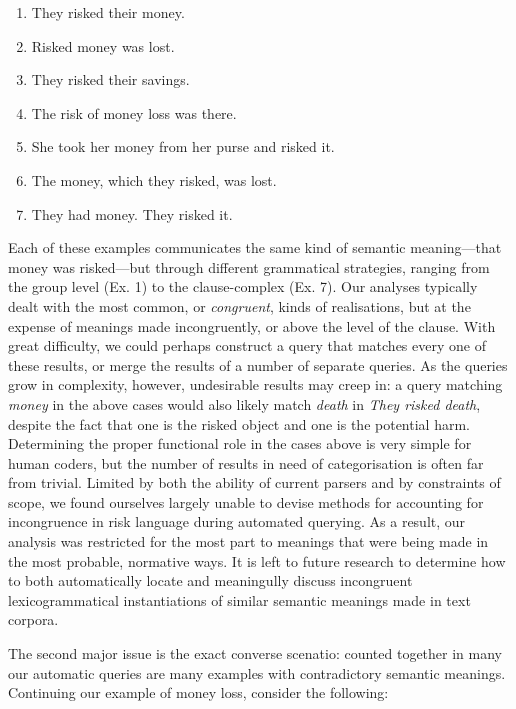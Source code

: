 \begin{enumerate} [before=\color{black}\ttfamily] \setlength\itemsep{0em} \small \setlength\itemsep{0em} \small
\item They risked their money.
\item Risked money was lost.
\item They risked their savings.
\item The risk of money loss was there.
\item She took her money from her purse and risked it.
\item The money, which they risked, was lost.
\item They had money. They risked it.
\end{enumerate}
%
Each of these examples communicates the same kind of semantic meaning---that money was risked---but through different grammatical strategies, ranging from the group level (Ex. 1) to the clause-complex (Ex. 7). Our analyses typically dealt with the most common, or \emph{congruent}, kinds of realisations, but at the expense of meanings made incongruently, or above the level of the clause. With great difficulty, we could perhaps construct a query that matches every one of these results, or merge the results of a number of separate queries. As the queries grow in complexity, however, undesirable results may creep in: a query matching \emph{money} in the above cases would also likely match \emph{death} in \emph{They risked death}, despite the fact that one is the risked object and one is the potential harm. Determining the proper functional role in the cases above is very simple for human coders, but the number of results in need of categorisation is often far from trivial. Limited by both the ability of current parsers and by constraints of scope, we found ourselves largely unable to devise methods for accounting for incongruence in risk language during automated querying. As a result, our analysis was restricted for the most part to meanings that were being made in the most probable, normative ways. It is left to future research to determine how to both automatically locate and meaningully discuss incongruent lexicogrammatical instantiations of similar semantic meanings made in text corpora.

The second major issue is the exact converse scenatio: counted together in many our automatic queries are many examples with contradictory semantic meanings. Continuing our example of money loss, consider the following:


